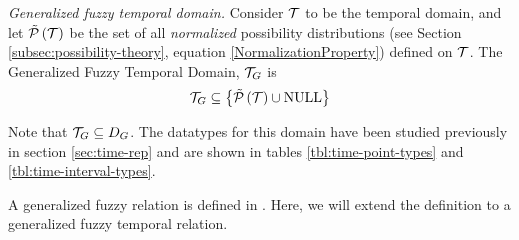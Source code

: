 \begin{definition}
\label{def:generalized-fuzzy-temporal-domain}
\emph{Generalized fuzzy temporal domain.}
Consider $\mathcal{T}$ to be the temporal domain, and let $\tilde {\mathcal{P}}\left( \mathcal{T}\right)$ be the set of all \emph{normalized} possibility distributions (see Section \ref{subsec:possibility-theory}, equation \eqref{NormalizationProperty}) defined on $\mathcal{T}$.
The Generalized Fuzzy Temporal Domain, $\mathcal{T}_G$ is
\begin{equation}
\mathcal{T}_G \subseteq \left \lbrace \tilde {\mathcal{P}}\left( \mathcal{T}\right) \cup \text{NULL} \right \rbrace
\end{equation}
\end{definition}

Note that $\mathcal{T}_G \subseteq D_G$. The datatypes for this domain have been studied previously in section \ref{sec:time-rep} and are shown in tables \ref{tbl:time-point-types} and \ref{tbl:time-interval-types}.

A generalized fuzzy relation is defined in \cite{Medina1994}. Here, we will extend the definition to a generalized fuzzy temporal relation.

